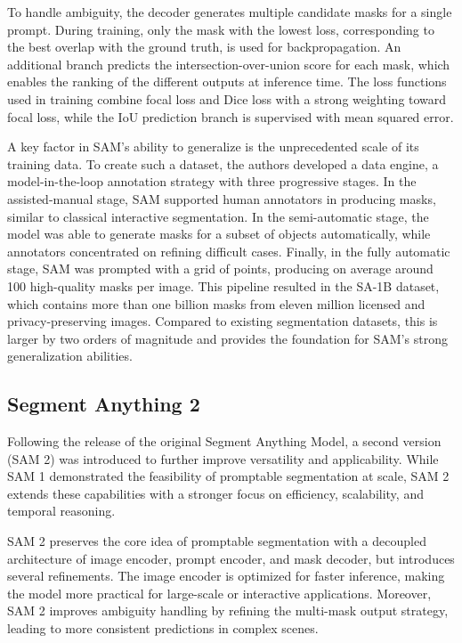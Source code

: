 To handle ambiguity, the decoder generates multiple candidate masks for a single prompt. During training, only the mask with the lowest loss, corresponding to the best overlap with the ground truth, is used for backpropagation. An additional branch predicts the intersection-over-union score for each mask, which enables the ranking of the different outputs at inference time. The loss functions used in training combine focal loss and Dice loss with a strong weighting toward focal loss, while the IoU prediction branch is supervised with mean squared error. 

A key factor in SAM’s ability to generalize is the unprecedented scale of its training data. To create such a dataset, the authors developed a data engine, a model-in-the-loop annotation strategy with three progressive stages. In the assisted-manual stage, SAM supported human annotators in producing masks, similar to classical interactive segmentation. In the semi-automatic stage, the model was able to generate masks for a subset of objects automatically, while annotators concentrated on refining difficult cases. Finally, in the fully automatic stage, SAM was prompted with a grid of points, producing on average around 100 high-quality masks per image. This pipeline resulted in the SA-1B dataset, which contains more than one billion masks from eleven million licensed and privacy-preserving images. Compared to existing segmentation datasets, this is larger by two orders of magnitude and provides the foundation for SAM’s strong generalization abilities. 


\subsection{Segment Anything 2}

Following the release of the original Segment Anything Model, a second version (SAM 2) was introduced to further improve versatility and applicability. While SAM 1 demonstrated the feasibility of promptable segmentation at scale, SAM 2 extends these capabilities with a stronger focus on efficiency, scalability, and temporal reasoning. 

SAM 2 preserves the core idea of promptable segmentation with a decoupled architecture of image encoder, prompt encoder, and mask decoder, but introduces several refinements. The image encoder is optimized for faster inference, making the model more practical for large-scale or interactive applications. Moreover, SAM 2 improves ambiguity handling by refining the multi-mask output strategy, leading to more consistent predictions in complex scenes. 

